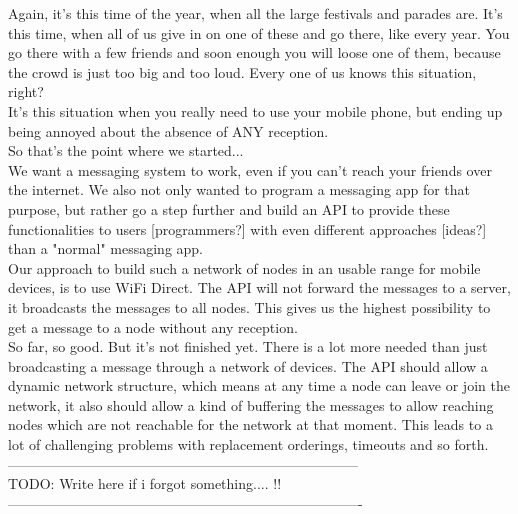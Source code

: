 Again, it's this time of the year, when all the large festivals and parades are. It's this time, when all of us give in on one of these and go there, like every year. 
You go there with a few friends and soon enough you will loose one of them, because the crowd is just too big and too loud. Every one of us knows this situation, right? \\
It's this situation when you really need to use your mobile phone, but ending up being annoyed about the absence of ANY reception. \\
So that's the point where we started... \\

We want a messaging system to work, even if you can't reach your friends over the internet. We also not only wanted to program a messaging app for that purpose, but rather go a step further and build an API to provide these functionalities to users [programmers?] with even different approaches [ideas?] than a "normal" messaging app. \\

Our approach to build such a network of nodes in an usable range for mobile devices, is to use WiFi Direct. The API will not forward the messages to a server, it broadcasts the messages to all nodes. This gives us the highest possibility to get a message to a node without any reception. \\

So far, so good. But it's not finished yet. There is a lot more needed than just broadcasting a message through a network of devices. The API should allow a dynamic network structure, which means at any time a node can leave or join the network, it also should allow a kind of buffering the messages to allow reaching nodes which are not reachable for the network at that moment. This leads to a lot of challenging problems with replacement orderings, timeouts and so forth. \\

---------------------------------------------------------------------------\\
TODO: Write here if i forgot something.... !! \\

----------------------------------------------------------------------------